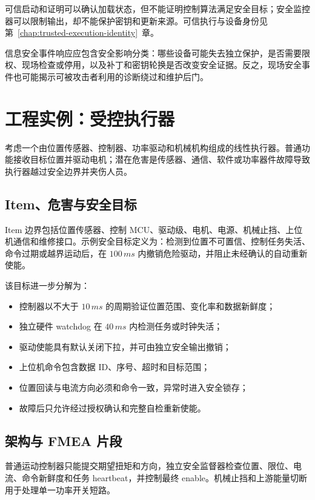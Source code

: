 可信启动和证明可以确认加载状态，但不能证明控制算法满足安全目标；安全监控器可以限制输出，却不能保护密钥和更新来源。可信执行与设备身份见 \mbox{第~\ref{chap:trusted-execution-identity}~章}。

信息安全事件响应应包含安全影响分类：哪些设备可能失去独立保护，是否需要限权、现场检查或停用，以及补丁和密钥轮换是否改变安全证据。反之，现场安全事件也可能揭示可被攻击者利用的诊断绕过和维护后门。

\section{工程实例：受控执行器}

考虑一个由位置传感器、控制器、功率驱动和机械机构组成的线性执行器。普通功能接收目标位置并驱动电机；潜在危害是传感器、通信、软件或功率器件故障导致执行器越过安全边界并夹伤人员。

\subsection{Item、危害与安全目标}

Item 边界包括位置传感器、控制 MCU、驱动级、电机、电源、机械止挡、上位机通信和维修接口。示例安全目标定义为：检测到位置不可置信、控制任务失活、命令过期或越界运动后，在 $100\,ms$ 内撤销危险驱动，并阻止未经确认的自动重新使能。

该目标进一步分解为：

\begin{itemize}
  \item 控制器以不大于 $10\,ms$ 的周期验证位置范围、变化率和数据新鲜度；
  \item 独立硬件 watchdog 在 $40\,ms$ 内检测任务或时钟失活；
  \item 驱动使能具有默认关闭下拉，并可由独立安全输出撤销；
  \item 上位机命令包含数据 ID、序号、超时和目标范围；
  \item 位置回读与电流方向必须和命令一致，异常时进入安全锁存；
  \item 故障后只允许经过授权确认和完整自检重新使能。
\end{itemize}

\subsection{架构与 FMEA 片段}

普通运动控制器只能提交期望扭矩和方向，独立安全监督器检查位置、限位、电流、命令新鲜度和任务 heartbeat，并控制最终 enable。机械止挡和上游能量切断用于处理单一功率开关短路。

